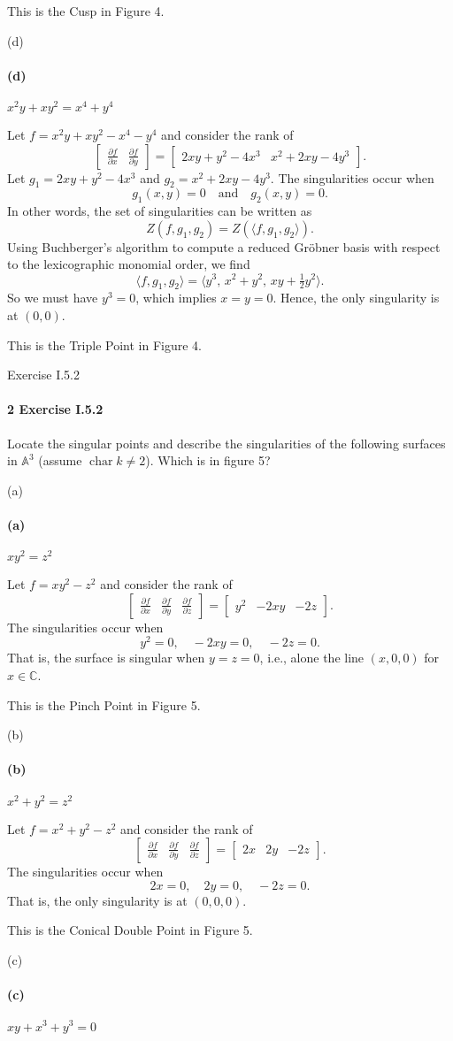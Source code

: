 \documentclass[12pt]{article}
\newlength{\myparskip}
\newenvironment{fullbox}{\begin{lrbox}{\savefullbox}\begin{minipage}{\dimexpr\textwidth-2\fboxsep\relax}\setlength{\parskip}{\myparskip}}{\end{minipage}\end{lrbox}\framebox[\textwidth]{\usebox{\savefullbox}}}
\newenvironment{pbox}[1][]{\begin{fullbox}\ifx#1\empty\else\paragraph{#1}\fi}{\end{fullbox}}
\newcommand{\isp}[1]{\quad\text{#1}\quad}
\newcommand{\C}{\mathbb{C}}
\newcommand{\<}{\langle}
\renewcommand{\>}{\rangle}
\newcommand{\A}{\mathbb{A}}
\newcommand{\mat}[1]{\begin{bmatrix}#1\end{bmatrix}}
\newcommand{\pdv}[2]{\frac{\partial #1}{\partial #2}}
\begin{document}
This is the Cusp in Figure 4.

\begin{pbox}[(d)]
    $x^2y + xy^2 = x^4 + y^4$
\end{pbox}

Let $f = x^2y + xy^2 - x^4 - y^4$ and consider the rank of
\[
    \mat{\pdv{f}{x} & \pdv{f}{y}} = \mat{2xy + y^2 - 4x^3 & x^2 + 2xy - 4y^3}.
\]
Let $g_1 = 2xy + y^2 - 4x^3$ and $g_2 = x^2 + 2xy - 4y^3$. The singularities occur when
\[
    g_1(x, y) = 0 \isp{and} g_2(x, y) = 0.
\]
In other words, the set of singularities can be written as
\[
    Z(f, g_1, g_2) = Z(\<f, g_1, g_2\>).
\]
Using Buchberger's algorithm to compute a reduced Gr\"obner basis with respect to the lexicographic monomial order, we find
\[
    \<f, g_1, g_2\> = \<y^3,\, x^2 + y^2,\, xy + \tfrac{1}{2}y^2\>.
\]
So we must have $y^3 = 0$, which implies $x = y = 0$. Hence, the only singularity is at $(0, 0)$.

This is the Triple Point in Figure 4.



\newpage
\begin{pbox}[2 Exercise I.5.2]
    Locate the singular points and describe the singularities of the following surfaces in $\A^3$ (assume $\operatorname{char} k \ne 2$). Which is in figure 5?
\end{pbox}

\begin{pbox}[(a)]
    $xy^2 = z^2$
\end{pbox}

Let $f = xy^2 - z^2$ and consider the rank of
\[
    \mat{\pdv{f}{x} & \pdv{f}{y} & \pdv{f}{z}} = \mat{y^2 & -2xy & -2z}.
\]
The singularities occur when
\[
    y^2 = 0, \quad -2xy = 0, \quad -2z = 0.
\]
That is, the surface is singular when $y = z = 0$, i.e., alone the line $(x, 0, 0)$ for $x \in \C$.

This is the Pinch Point in Figure 5.

\begin{pbox}[(b)]
    $x^2 + y^2 = z^2$
\end{pbox}

Let $f = x^2 + y^2 - z^2$ and consider the rank of
\[
    \mat{\pdv{f}{x} & \pdv{f}{y} & \pdv{f}{z}} = \mat{2x & 2y & -2z}.
\]
The singularities occur when
\[
    2x = 0, \quad 2y = 0, \quad -2z = 0.
\]
That is, the only singularity is at $(0, 0, 0)$.

This is the Conical Double Point in Figure 5.

\newpage
\begin{pbox}[(c)]
    $xy + x^3 + y^3 = 0$
\end{pbox}
\end{document}
